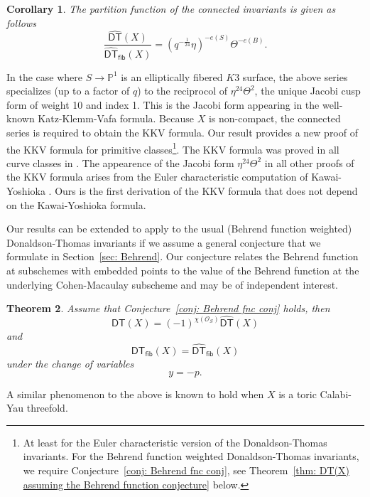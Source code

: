 \documentclass[12pt]{amsart}
\newtheorem{theorem}{Theorem}%
\newtheorem{corollary}[theorem]{Corollary}
\theoremstyle{definition}
\newcommand{\PP} {\mathbb{P}}
\renewcommand{\O}{\mathcal{O}}
\newcommand{\DT}{\mathsf{DT}}
\newcommand{\DThat}{\widehat{\DT}}
\newcommand{\fiber}{\mathsf{fib}}
\begin{document}
\begin{corollary} The partition function of the connected invariants is given as follows
\[
\frac{\DThat (X)}{\DThat_{\fiber}(X)}=
\left(q^{-\frac{1}{24}}\eta  \right)^{-e(S)}\Theta^{-e(B)}.
\]
\end{corollary}

In the case where $S \rightarrow \PP^1$ is an elliptically fibered
$K3$ surface, the above series specializes (up to a factor of $q$) to
the reciprocol of $\eta^{24}\Theta^{2}$, the unique Jacobi cusp form
of weight 10 and index 1. This is the Jacobi form appearing in the
well-known Katz-Klemm-Vafa formula. Because $X$ is non-compact, the
connected series is required to obtain the KKV formula. Our result
provides a new proof of the KKV formula for primitive
classes\footnote{At least for the Euler characteristic version of the
Donaldson-Thomas invariants. For the Behrend function weighted
Donaldson-Thomas invariants, we require Conjecture~\ref{conj: Behrend
fnc conj}, see Theorem~\ref{thm: DT(X) assuming the Behrend function
conjecture} below.}. The KKV formula was proved in all curve classes
in \cite{Pandharipande-Thomas-KKV}. The appearence of the Jacobi form
$\eta^{24} \Theta^{2}$ in all other proofs of the KKV formula arises
from the Euler characteristic computation of Kawai-Yoshioka
\cite{Kawai-Yoshioka}. Ours is the first derivation of the KKV
formula that does not depend on the Kawai-Yoshioka formula.

Our results can be extended to apply to the usual (Behrend function
weighted) Donaldson-Thomas invariants if we assume a general
conjecture that we formulate in Section~\ref{sec: Behrend}. Our
conjecture relates the Behrend function at subschemes with embedded
points to the value of the Behrend function at the underlying
Cohen-Macaulay subscheme and may be of independent interest.

\begin{theorem}\label{thm: DT(X) assuming the Behrend function conjecture}
Assume that Conjecture~\ref{conj: Behrend fnc conj} holds, then
\[
\DT (X) = (-1)^{\chi (\O_{S})} \DThat (X)
\]
and
\[
\DT_{\fiber } (X) =  \DThat_{\fiber } (X)
\]
under the change of variables
\[
y=-p.
\]
\end{theorem}

A similar phenomenon to the above is known to hold when $X$ is a toric
Calabi-Yau threefold.
\end{document}
